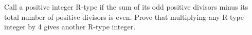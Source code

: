 Call a positive integer R-type if the sum of its odd positive divisors minus its total number of positive divisors is even. Prove that multiplying any R-type integer by 4 gives another R-type integer.
